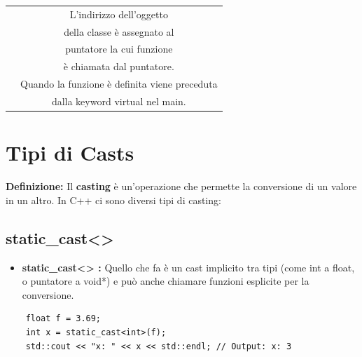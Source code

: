 \begin{tabular}{|c|c|}
	\textsf{\small } & \textsf{\small L'indirizzo dell'oggetto} \\
	\textsf{\small } & \textsf{\small della classe è assegnato al} \\
	\textsf{\small } & \textsf{\small puntatore la cui funzione} \\
	\textsf{\small } & \textsf{\small è chiamata dal puntatore.} \\
	\hline
	\textsf{\small } & \textsf{\small Quando la funzione è definita viene preceduta} \\
	\textsf{\small } & \textsf{\small dalla keyword virtual nel main.} \\
	\hline
\end{tabular}


\newpage

\section{Tipi di Casts}

\textsf{\small \textbf{Definizione:} Il \textbf{casting} è un'operazione che permette la conversione di un valore in un altro. In C++ ci sono diversi tipi di casting: } \\

\subsection{static\_cast<>}

\begin{itemize}
	\item \textsf{\small \textbf{static\_cast<> :} Quello che fa è un cast implicito tra tipi (come int a float, o puntatore a void*) e può anche chiamare funzioni esplicite per la conversione. }
\end{itemize}

\begin{lstlisting}
	float f = 3.69;
	int x = static_cast<int>(f);
	std::cout << "x: " << x << std::endl; // Output: x: 3 
\end{lstlisting}

